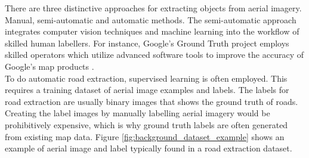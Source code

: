 There are three distinctive approaches for extracting objects from aerial imagery. Manual, semi-automatic and automatic methods. The semi-automatic approach integrates computer vision techniques and machine learning into the workflow of skilled human labellers. For instance, Google's Ground Truth project employs skilled operators which utilize advanced software tools to improve the accuracy of Google's map products \citep{Ground_truth}.\\

To do automatic road extraction, supervised learning is often employed. This requires a training dataset of aerial image examples and labels. The labels for road extraction are usually binary images that shows the ground truth of roads. Creating the label images by manually labelling aerial imagery would be prohibitively expensive, which is why ground truth labels are often generated from existing map data. Figure \ref{fig:background_dataset_example} shows an example of aerial image and label typically found in a road extraction dataset.\\

